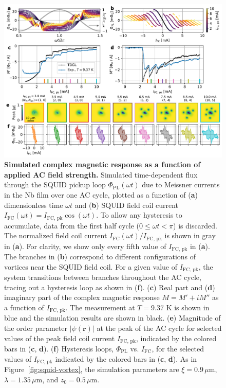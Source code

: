 \documentclass[%
 reprint,
 superscriptaddress,
 amsmath,
 amssymb,
 amsfonts,
 aps,
 prb,
]{revtex4-2}
\newcommand{\FC}{\mathrm{FC}}
\newcommand{\pk}{\mathrm{pk}}
\newcommand{\PL}{\mathrm{PL}}
\newcommand{\um}{\mu\mathrm{m}}
\begin{document}
\begin{figure}
    \centering
    \includegraphics[width=\linewidth]{figures/tdgl-sim-1.pdf}
    \caption{{\bf Simulated complex magnetic response as a function of applied AC field strength.} Simulated time-dependent flux through the SQUID pickup loop $\Phi_\PL(\omega t)$ due to Meissner currents in the Nb film over one AC cycle, plotted as a function of ({\bf a}) dimensionless time $\omega t$ and ({\bf b}) SQUID field coil current $I_\FC(\omega t)=I_{\FC,\,\pk}\cos(\omega t)$. To allow any hysteresis to accumulate, data from the first half cycle ($0 \leq \omega t < \pi$) is discarded. The normalized field coil current $I_\FC(\omega t)/I_{\FC,\,\pk}$ is shown in gray in ({\bf a}). For clarity, we show only every fifth value of $I_{\FC,\,\pk}$ in ({\bf a}). The branches in ({\bf b}) correspond to different configurations of vortices near the SQUID field coil. For a given value of $I_{\FC,\,\pk}$, the system transitions between branches throughout the AC cycle, tracing out a hysteresis loop as shown in ({\bf f}). ({\bf c}) Real part and ({\bf d}) imaginary part of the complex magnetic response $M=M'+iM''$ as a function of $I_{\FC,\,\pk}$. The measurement at $T=9.37$ K is shown in blue and the simulation results are shown in black. ({\bf e}) Magnitude of the order parameter $|\psi(\mathbf{r})|$ at the peak of the AC cycle for selected values of the peak field coil current $I_{\FC,\,\pk}$, indicated by the colored bars in ({\bf c}, {\bf d}). ({\bf f}) Hysteresis loops, $\Phi_\PL$ vs. $I_{\FC}$, for the selected values of $I_{\FC,\,\pk}$ indicated by the colored bars in ({\bf c}, {\bf d}). As in Figure~\ref{fig:squid-vortex}, the simulation parameters are $\xi=0.9\,\um$, $\lambda=1.35\,\um$, and $z_0=0.5\,\um$.}
    \label{fig:M-vs-Ifc-sim}
\end{figure}
\end{document}
